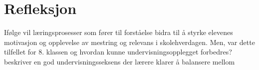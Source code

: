 \documentclass[main.tex]{subfiles}
\begin{document}
\section*{Refleksjon}
\label{sec:3}

Ifølge  vil læringsprosesser som fører til forståelse bidra til å styrke elevenes 
motivasjon og opplevelse av mestring og relevans i skolehverdagen. Men, var dette tilfellet for 8. 
klassen og hvordan kunne undervisningsopplegget forbedres?
\newline
\newline
{} beskriver en god undervisningsseksens der lærere klarer å balansere mellom 
\end{document}
